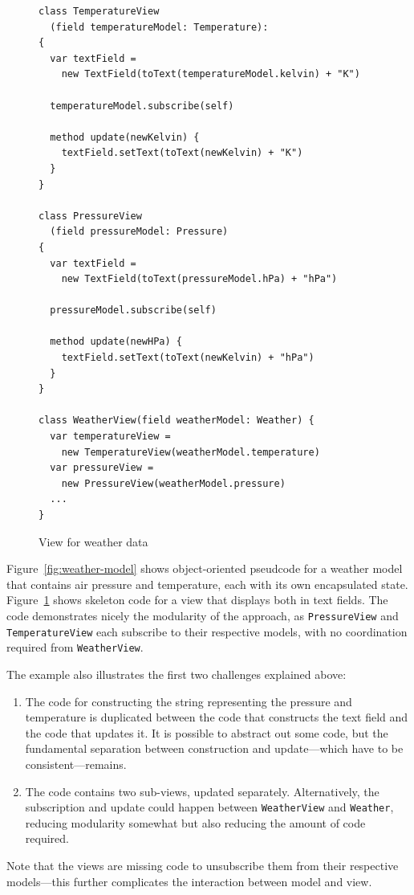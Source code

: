 \documentclass[sigplan,screen]{acmart}
\begin{document}
\begin{figure}[tb]
\begin{verbatim}
class TemperatureView
  (field temperatureModel: Temperature):
{
  var textField =
    new TextField(toText(temperatureModel.kelvin) + "K")

  temperatureModel.subscribe(self)

  method update(newKelvin) {
    textField.setText(toText(newKelvin) + "K")
  }
}

class PressureView
  (field pressureModel: Pressure)
{
  var textField =
    new TextField(toText(pressureModel.hPa) + "hPa")

  pressureModel.subscribe(self)

  method update(newHPa) {
    textField.setText(toText(newKelvin) + "hPa")
  }
}

class WeatherView(field weatherModel: Weather) {
  var temperatureView =
    new TemperatureView(weatherModel.temperature)
  var pressureView =
    new PressureView(weatherModel.pressure)
  ...
}
\end{verbatim}
  \caption{View for weather data}
  \label{fig:weather-view}
\end{figure}
%
Figure~\ref{fig:weather-model} shows object-oriented pseudcode for a
weather model that contains air pressure and temperature, each with
its own encapsulated state.  Figure~\ref{fig:weather-view} shows
skeleton code for a view that displays both in text fields.  The code
demonstrates nicely the modularity of the approach, as
\texttt{PressureView} and \texttt{TemperatureView} each subscribe to
their respective models, with no coordination required from
\texttt{WeatherView}.

The example also illustrates the first two challenges explained above:
%
\begin{enumerate}
\item The code for constructing the string representing the pressure
  and temperature is duplicated between the code that constructs the
  text field and the code that updates it.  It is possible to abstract
  out some code, but the fundamental separation between construction
  and update---which have to be consistent---remains.
\item The code contains two sub-views, updated separately.
  Alternatively, the subscription and update could happen between
  \texttt{WeatherView} and \texttt{Weather}, reducing modularity
  somewhat but also reducing the amount of code required.
\end{enumerate}
%
Note that the views are missing code to unsubscribe them from their
respective models---this further complicates the interaction between
model and view.
\end{document}
